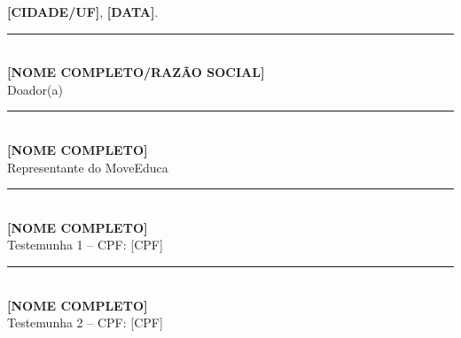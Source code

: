 \documentclass[11pt,a4paper]{article}
\begin{document}
\vspace{2cm}
\begin{center}
\textbf{[CIDADE/UF]}, \textbf{[DATA]}.

\vspace{2cm}
\rule{8cm}{0.4pt}\\
\textbf{[NOME COMPLETO/RAZÃO SOCIAL]}\\
Doador(a)

\vspace{1.5cm}
\rule{8cm}{0.4pt}\\
\textbf{[NOME COMPLETO]}\\
Representante do MoveEduca

\vspace{1.5cm}
\rule{8cm}{0.4pt}\\
\textbf{[NOME COMPLETO]}\\
Testemunha 1 -- CPF: [CPF]

\vspace{1.5cm}
\rule{8cm}{0.4pt}\\
\textbf{[NOME COMPLETO]}\\
Testemunha 2 -- CPF: [CPF]
\end{center}
\end{document}

